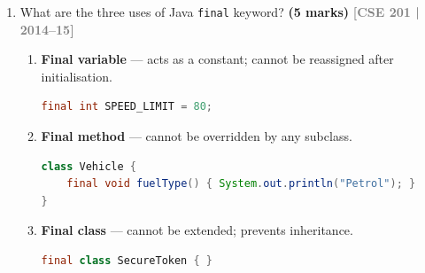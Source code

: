 \documentclass[12pt,a3paper]{article}
\newcommand{\yr}[1]{\hfill\textcolor{gray}{\small\textbf{[#1]}}}
\newcommand{\mk}[1]{\textcolor{orange!70!black}{\small\textbf{(#1 marks)}}}
\begin{document}
\begin{enumerate}
\begin{tcolorbox}[enhanced,breakable,ansbox,
  colback=cD!4,colframe=cD,boxrule=0.8pt,arc=5pt,
  title={\textbf{Answer --- Static Code Block}},
  fonttitle=\bfseries\color{white},colbacktitle=cD]
\begin{lstlisting}[language=Java]
    Demo() { System.out.println("Constructor called"); }
}

public class Main {
    public static void main(String[] args) {
        System.out.println("main() started");
        Demo d1 = new Demo();
        Demo d2 = new Demo();
    }
}
\end{lstlisting}

\textbf{Output:}
\begin{lstlisting}
First static block: x = 10
Second static block: y = 20
main() started
Constructor called
Constructor called
\end{lstlisting}

\textit{The static blocks ran once before \texttt{main()}, in
top-to-bottom order.  The constructor ran twice (once per object).}

\end{tcolorbox}

\item What are the three uses of Java \texttt{final} keyword? \mk{5}
\yr{CSE 201 | 2014--15}

\begin{tcolorbox}[enhanced,breakable,ansbox,
  colback=cD!4,colframe=cD,boxrule=0.8pt,arc=5pt,
  title={\textbf{Answer --- Three Uses of the \texttt{final} Keyword}},
  fonttitle=\bfseries\color{white},colbacktitle=cD]

\begin{enumerate}[label=\textbf{\arabic*.}]
  \item \textbf{Final variable} --- acts as a constant; cannot be
    reassigned after initialisation.
    \begin{lstlisting}[language=Java]
final int SPEED_LIMIT = 80;
    \end{lstlisting}

  \item \textbf{Final method} --- cannot be overridden by any subclass.
    \begin{lstlisting}[language=Java]
class Vehicle {
    final void fuelType() { System.out.println("Petrol"); }
}
    \end{lstlisting}

  \item \textbf{Final class} --- cannot be extended; prevents inheritance.
    \begin{lstlisting}[language=Java]
final class SecureToken { }
    \end{lstlisting}
\end{enumerate}


\end{tcolorbox}
\end{enumerate}
\end{document}
